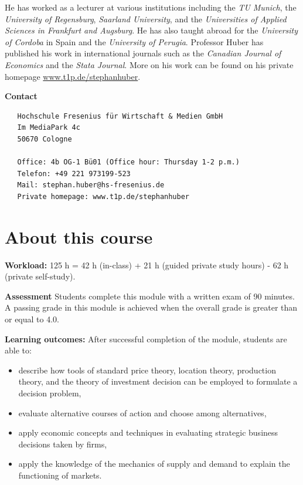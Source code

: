\documentclass[
  12pt,
  oneside]{book}
\providecommand{\tightlist}{%
  \setlength{\itemsep}{0pt}\setlength{\parskip}{0pt}}
\theoremstyle{definition}
\theoremstyle{definition}
\theoremstyle{definition}
\theoremstyle{definition}
\theoremstyle{remark}
\begin{document}
He has worked as a lecturer at various institutions including the \emph{TU Munich}, the \emph{University of Regensburg}, \emph{Saarland University}, and the \emph{Universities of Applied Sciences in Frankfurt and Augsburg}. He has also taught abroad for the \emph{University of Cordoba} in Spain and the \emph{University of Perugia}. Professor Huber has published his work in international journals such as the \emph{Canadian Journal of Economics} and the \emph{Stata Journal}. More on his work can be found on his private homepage \href{https://www.t1p.de/stephanhuber}{www.t1p.de/stephanhuber}.

\textbf{Contact}

\begin{verbatim}
   Hochschule Fresenius für Wirtschaft & Medien GmbH
   Im MediaPark 4c
   50670 Cologne
   
   Office: 4b OG-1 Bü01 (Office hour: Thursday 1-2 p.m.)
   Telefon: +49 221 973199-523
   Mail: stephan.huber@hs-fresenius.de
   Private homepage: www.t1p.de/stephanhuber
\end{verbatim}

\hypertarget{about-this-course}{%
\section*{About this course}\label{about-this-course}}

\textbf{Workload:}
125 h = 42 h (in-class) + 21 h (guided private study hours) - 62 h (private self-study).

\textbf{Assessment}
Students complete this module with a written exam of 90 minutes. A passing grade in this module is achieved when the overall grade is greater than or equal to 4.0.

\textbf{Learning outcomes:}
After successful completion of the module, students are able to:

\begin{itemize}
\tightlist
\item
  describe how tools of standard price theory, location theory, production theory, and the theory of investment decision can be employed to formulate a decision problem,
\item
  evaluate alternative courses of action and choose among alternatives,
\item
  apply economic concepts and techniques in evaluating strategic business decisions taken by firms,
\item
  apply the knowledge of the mechanics of supply and demand to explain the functioning of markets.
\end{itemize}
\end{document}

